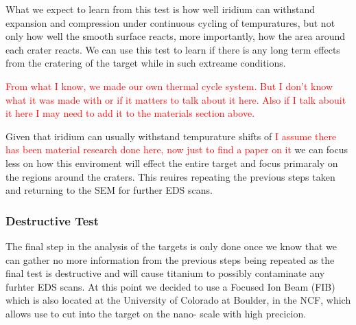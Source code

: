 \documentclass[review]{elsarticle}
\begin{document}
			What we expect to learn from this test is how well iridium can withstand expansion and compression under continuous cycling of tempuratures, but not only how well 
			the smooth surface reacts, more importantly, how the area around each crater reacts. We can use this test to learn if there is any long term effects from the cratering
			of the target while in such extreame conditions. 

			\textcolor{red}{From what I know, we made our own thermal cycle system. But I don't know what it was made with or if it matters to talk about it here. Also if I talk abouit it here
			I may need to add it to the materials section above.} 

			Given that iridium can usually withstand tempurature shifts of \textcolor{red}{I assume there has been material research done here, now just to find a paper on it} we can
			focus less on how this enviroment will effect the entire target and focus primaraly on the regions around the craters. This reuires repeating the previous steps taken and 
			returning to the SEM for further EDS scans. 

			\subsubsection{Destructive Test}
			The final step in the analysis of the targets is only done once we know that we can gather no more information from the previous steps being repeated as the final
			test is destructive and will cause titanium to possibly contaminate any furhter EDS scans. At this point we decided to use a Focused Ion Beam (FIB) which is also located
			at the University of Colorado at Boulder, in the NCF, which allows use to cut into the target on the nano- scale with high precicion. 
\end{document}
